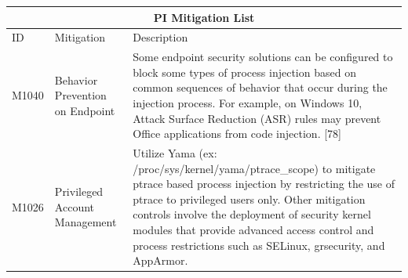 \documentclass{article}
\begin{document}
\begin{table}[h!]
\centering
\begin{tabular}{ |p{1.2cm}||p{2cm}|p{11.5cm}|  }
  \hline
  \multicolumn{3}{|c|}{PI Mitigation List} \\
  \hline
  ID	& Mitigation & Description \\
  \hline
  M1040	& Behavior Prevention on Endpoint &	Some endpoint security solutions can be configured to block some types of
                                            process injection based on common sequences of behavior that occur during the
                                            injection process. For example, on Windows 10, Attack Surface Reduction (ASR)
                                            rules may prevent Office applications from code injection. [78] \\
  \hline
  M1026 & Privileged Account Management	& Utilize Yama (ex: /proc/sys/kernel/yama/ptrace\_scope) to mitigate ptrace based
                                          process injection by restricting the use of ptrace to privileged users only. Other
                                          mitigation controls involve the deployment of security kernel modules that provide
                                          advanced access control and process restrictions such as SELinux, grsecurity,
                                          and AppArmor. \\
  \hline
\end{tabular}
\label{table: Mitigations}
\end{table}
\end{document}
